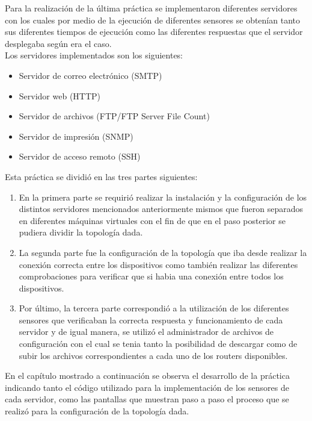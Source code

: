Para la realización de la última práctica se implementaron diferentes servidores con los cuales por medio de la ejecución de diferentes sensores se obtenían tanto sus diferentes tiempos de ejecución como las diferentes respuestas que el servidor desplegaba según era el caso.\\
Los servidores implementados son los siguientes:
\begin{itemize}
\item Servidor de correo electrónico (SMTP)
\item Servidor web (HTTP)
\item Servidor de archivos (FTP/FTP Server File Count)
\item Servidor de impresión (SNMP)
\item Servidor de acceso remoto (SSH)
\end{itemize} 

Esta práctica se dividió en las tres partes siguientes:
\begin{enumerate}
\item En la primera parte se requirió realizar la instalación y la configuración de los distintos servidores mencionados anteriormente mismos que fueron separados en diferentes máquinas virtuales con el fin de que en el paso posterior se pudiera dividir la topología dada.
\item La segunda parte fue la configuración de la topología que iba desde realizar la conexión correcta entre los dispositivos como también realizar las diferentes comprobaciones para verificar que si habia una conexión entre todos los dispositivos.
\item Por último, la tercera parte correspondió a la utilización de los diferentes sensores que verificaban la correcta respuesta y funcionamiento de cada servidor y de igual manera, se utilizó el administrador de archivos de configuración con el cual se tenia tanto la posibilidad de descargar como de subir los archivos correspondientes a cada uno de los routers disponibles.
\end{enumerate}

En el capítulo mostrado a continuación se observa el desarrollo de la práctica indicando tanto el código utilizado para la implementación de los sensores de cada servidor, como las pantallas que muestran paso a paso el proceso que se realizó para la configuración de la topología dada.



 